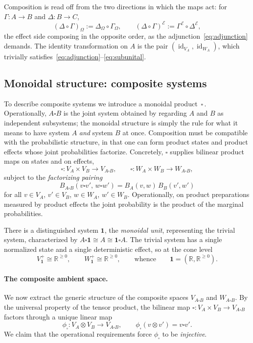 \documentclass[prl,aps,10pt,superscriptaddress, floatfix]{revtex4-2}
\begin{document}
Composition is read off from the two directions in which the maps act: for $\Gamma:A\to B$ and $\Delta:B\to C$,
\[
(\Delta\circ\Gamma)_\Omega := \Delta_\Omega\circ\Gamma_\Omega,
\qquad
(\Delta\circ\Gamma)^{\mathcal E} := \Gamma^{\mathcal E}\circ\Delta^{\mathcal E},
\]
the effect side composing in the opposite order, as the adjunction~\eqref{eq:adjunction} demands. The identity transformation on $A$ is the pair $(\operatorname{id}_{V_A},\operatorname{id}_{W_A})$, which trivially satisfies~\eqref{eq:adjunction}--\eqref{eq:subunital}.

\subsection{Monoidal structure: composite systems}

To describe composite systems we introduce a monoidal product $\,\square\,$. Operationally, $A\square B$ is the joint system obtained by regarding $A$ and $B$ as independent subsystems; the monoidal structure is simply the rule for what it means to have system $A$ \emph{and} system $B$ at once. Composition must be compatible with the probabilistic structure, in that one can form product states and product effects whose joint probabilities factorize. Concretely, $\square$ supplies bilinear product maps on states and on effects,
\[
\square : V_A \times V_B \to V_{A\square B},
\qquad
\square : W_A \times W_B \to W_{A\square B},
\]
subject to the \emph{factorizing pairing}
\begin{equation}\label{eq:factorizing}
B_{A\square B}(v\square v',\, w\square w') = B_A(v,w)\,B_B(v',w')
\end{equation}
for all $v\in V_A$, $v'\in V_B$, $w\in W_A$, $w'\in W_B$. Operationally, on product preparations measured by product effects the joint probability is the product of the marginal probabilities.

There is a distinguished system $\mathbf{1}$, the \emph{monoidal unit}, representing the trivial system, characterized by $A\square\mathbf 1\cong A\cong\mathbf 1\square A$. The trivial system has a single normalized state and a single deterministic effect, so at the cone level
\[
V_{\mathbf 1}^+\cong\mathbb{R}^{\ge 0},
\qquad
W_{\mathbf 1}^+\cong\mathbb{R}^{\ge 0},
\qquad\text{whence}\qquad
\mathbf 1=(\mathbb{R},\mathbb{R}^{\ge 0}).
\]

\paragraph{The composite ambient space.}
We now extract the generic structure of the composite spaces $V_{A\square B}$ and $W_{A\square B}$. By the universal property of the tensor product, the bilinear map $\square:V_A\times V_B\to V_{A\square B}$ factors through a unique linear map
\[
\phi_\square : V_A\otimes V_B \to V_{A\square B},
\qquad
\phi_\square(v\otimes v')=v\square v'.
\]
We claim that the operational requirements force $\phi_\square$ to be \emph{injective}.
\end{document}
